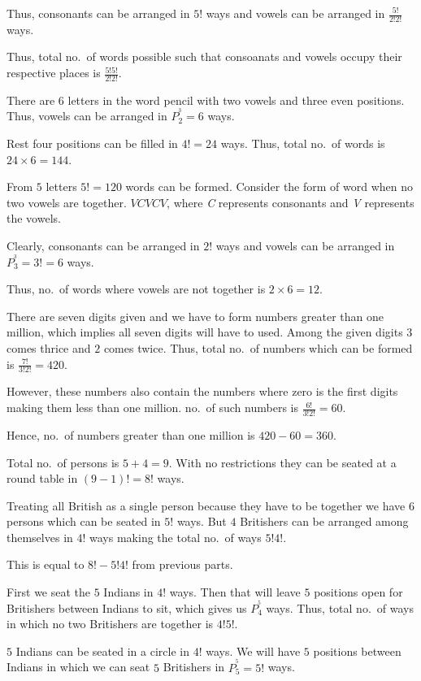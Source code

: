   Thus, consonants can be arranged in $5!$ ways and vowels can be arranged in $\frac{5!}{2!2!}$ ways.

  Thus, total no.\ of words possible such that consoanats and vowels occupy their respective places is
  $\frac{5!5!}{2!2!}$.
\item There are $6$ letters in the word pencil with two vowels and three even positions. Thus, vowels can be
  arranged in $P_2^^3 = 6$ ways.

  Rest four positions can be filled in $4! = 24$ ways. Thus, total no.\ of words is $24\times6 = 144$.
\item From $5$ letters $5!= 120$ words can be formed. Consider the form of word when no two vowels are
  together. $VCVCV$, where {\it C} represents consonants and {\it V} represents the vowels.

  Clearly, consonants can be arranged in $2!$ ways and vowels can be arranged in $P_3^^3 = 3! = 6$ ways.

  Thus, no.\ of words where vowels are not together is $2\times6 = 12$.
\item There are seven digits given and we have to form numbers greater than one million, which implies all
  seven digits will have to used. Among the given digits $3$ comes thrice and $2$ comes twice. Thus, total
  no.\ of numbers which can be formed is $\frac{7!}{3!2!} = 420$.

  However, these numbers also contain the numbers where zero is the first digits making them less than one
  million. no.\ of such numbers is $\frac{6!}{3!2!} = 60$.

  Hence, no.\ of numbers greater than one million is $420 - 60 = 360$.
\item
  \startitemize[i]
  \item Total no.\ of persons is $5 + 4 = 9$. With no restrictions they can be seated at a round table in $(9
    - 1)! = 8!$ ways.
  \item Treating all British as a single person because they have to be together we have $6$ persons which
    can be seated in $5!$ ways. But $4$ Britishers can be arranged among themselves in $4!$ ways making the
    total no.\ of ways $5!4!$.
  \item This is equal to $8! - 5!4!$ from previous parts.
  \item First we seat the $5$ Indians in $4!$ ways. Then that will leave $5$ positions open for Britishers
    between Indians to sit, which gives us $P_4^^5$ ways. Thus, total no.\ of ways in which no two Britishers
    are together is $4!5!$.
  \stopitemize
\item $5$ Indians can be seated in a circle in $4!$ ways. We will have $5$ positions between Indians in
  which we can seat $5$ Britishers in $P_5^^5 = 5!$ ways.

